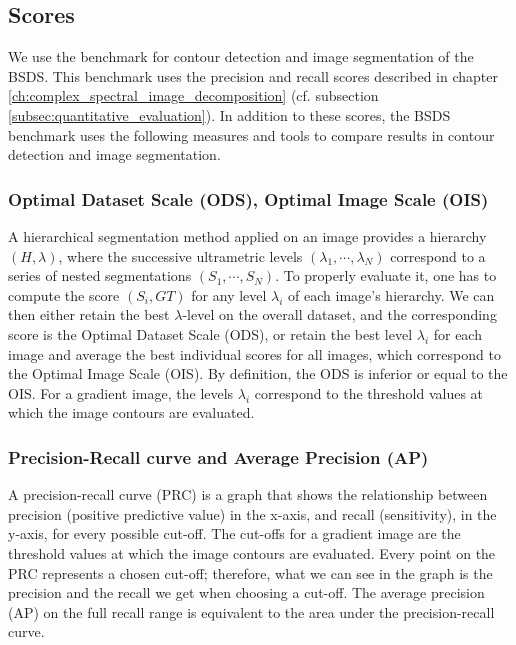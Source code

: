 \subsection{Scores}
We use the benchmark for contour detection and image segmentation of the BSDS. This benchmark uses the precision and recall scores described in chapter \ref{ch:complex_spectral_image_decomposition} (cf. subsection \ref{subsec:quantitative_evaluation}). In addition to these scores, the BSDS benchmark uses the following measures and tools to compare results in contour detection and image segmentation.


\subsubsection{Optimal Dataset Scale (ODS), Optimal Image Scale (OIS)}

A hierarchical segmentation method applied on an image provides a hierarchy $(H, \lambda)$, where the successive ultrametric levels $(\lambda_1, \cdots , \lambda_N )$ correspond to a series of nested segmentations $(S_1, \cdots , S_N )$. To properly evaluate it, one has to compute the score $(S_i , GT )$ for any level $\lambda_i$ of each image's hierarchy. We can then either retain the best $\lambda$-level on the overall dataset, and the corresponding score is the Optimal Dataset Scale (ODS), or retain the best level $\lambda_i$ for each image and average the best individual scores for all images, which correspond to the Optimal Image Scale (OIS). By definition, the ODS is inferior or equal to the OIS. For a gradient image, the levels $\lambda_i$ correspond to the threshold values at which the image contours are evaluated.

\subsubsection{Precision-Recall curve and Average Precision (AP)}

A precision-recall curve (PRC) is a graph that shows the relationship between precision (positive predictive value) in the x-axis, and recall (sensitivity), in the y-axis, for every possible cut-off. The cut-offs for a gradient image are the threshold values at which the image contours are evaluated. Every point on the PRC represents a chosen cut-off; therefore, what we can see in the graph is the precision and the recall we get when choosing a cut-off. The average precision (AP) on the full recall range is equivalent to the area under the precision-recall curve.

